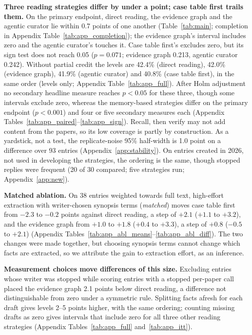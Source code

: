 \documentclass{article} %
\begin{document}
\textbf{Three reading strategies differ by under a point; case table first trails them.} On the primary endpoint, direct reading, the evidence graph and the agentic curator lie within 0.7 points of one another (Table~\ref{tab:main}; completion in Appendix Table~\ref{tab:app_completion}); the evidence graph's interval includes zero and the agentic curator's touches it. Case table first's excludes zero, but its sign test does not reach 0.05 ($p=0.071$; evidence graph 0.213, agentic curator 0.242). Without partial credit the levels are 42.4\% (direct reading), 42.0\% (evidence graph), 41.9\% (agentic curator) and 40.8\% (case table first), in the same order (levels only; Appendix Table~\ref{tab:app_full}). After Holm adjustment no secondary headline measure reaches $p<0.05$ for these three, though some intervals exclude zero, whereas the memory-based strategies differ on the primary endpoint ($p<0.001$) and four or five secondary measures each (Appendix Tables~\ref{tab:app_paired}--\ref{tab:app_sign}). Recall, then verify may not add content from the papers, so its low coverage is partly by construction. As a yardstick, not a test, the replicate-noise 95\% half-width is 1.0 point on a difference over 93 entries (Appendix~\ref{app:stability}). On entries created in 2026, not used in developing the strategies, the ordering is the same, though stopped replies were frequent (20 of 30 compared; five strategies run; Appendix~\ref{app:new}).

\textbf{Matched ablation.}\label{sec:ablation} On 38 entries weighted towards full text, high-effort extraction with writer-chosen synopsis terms (\emph{matched}) moves case table first from $-2.3$ to $-0.2$ points against direct reading, a step of $+2.1$ ($+1.1$ to $+3.2$), and the evidence graph from $+1.0$ to $+1.8$ ($+0.4$ to $+3.3$), a step of $+0.8$ ($-0.5$ to $+2.1$) (Appendix Tables~\ref{tab:app_abl_means}--\ref{tab:app_abl_diff}). The two changes were made together, but choosing synopsis terms cannot change which facts are extracted, so we attribute the gain to extraction effort, as an inference.

\textbf{Measurement choices move differences of this size.} Excluding entries whose writer was stopped while scoring entries with a stopped per-paper call placed the evidence graph 2.1 points below direct reading, a difference not distinguishable from zero under a symmetric rule. Splitting facts afresh for each draft gives levels 2--5 points higher, with the same ordering; counting missing drafts as zero gives intervals that include zero for all three other reading strategies (Appendix Tables~\ref{tab:app_full} and~\ref{tab:app_itt}).
\end{document}
